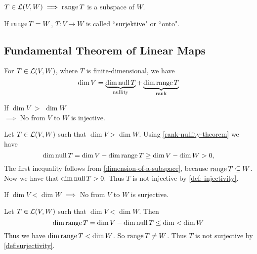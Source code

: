 \setcounter{thm}{17}
\begin{thm} [range]
  \label{thm: the range is a subspace}
  $T\in \mathcal{L}(V,W) \implies \operatorname{range} T$ is a subspace of $W$.
\end{thm}

\setcounter{thm}{18}
\begin{mydef} [surjectivity]
  \label{def: surjectivity}
  If $\operatorname{range} T=W$, $T:V\to W$ is called ``surjektive" or ``onto".
\end{mydef}

\subsection{Fundamental Theorem of Linear Maps}

  \setcounter{thm}{20}
  \begin{thm} 
    \label{rank-nullity-theorem}
    For $T \in {\mathcal{L}(V,W)}$, where $T$ is finite-dimensional, we have
    \begin{equation}
      \dim V =
      \underbrace{ \dim \operatorname{null} T }_{\text{nullity}}
      + \underbrace{\dim \operatorname{range} T}_{\text{rank}}
    \end{equation}
  \end{thm}

  \setcounter{thm}{21}
  \begin{thm} 
    \label{thm: linear-map-to-a-lower-dimensional-space-is-not-injective}
    If $\dim V$ $>$ $\dim W$ \\ 
    $\implies$ No \lm from $V$ to $W$ is injective.
  \end{thm}
  \begin{prf} Let $T\in \mathcal{L}(V,W)$ such that $\dim V > \dim W$. Using \ref{rank-nullity-theorem} we have
    \begin{equation}
      \dim \operatorname{null} T = \dim V - \dim \operatorname{range} T \geq \dim V - \dim W > 0,
    \end{equation}
    The first inequality follows from \ref{dimension-of-a-subspace}, because $\operatorname{range} T \subseteq W$. Now we have that $\dim \operatorname{null} T > 0.$ Thus $T$ is not injective by \autoref{def: injectivity}.
  \end{prf}

  \setcounter{thm}{23}
  \begin{thm} 
    If $\dim V < \dim W$ $\implies$ No \lm from $V$ to $W$ is surjective.
  \end{thm}
  \begin{prf}
    Let $T\in \mathcal{L} (V,W)$ such that $\dim V < \dim W$. Then
    \begin{equation}
      \dim \operatorname{range} T = \dim V - \dim \operatorname{null} T \leq \dim < \dim W
    \end{equation}
    Thus we have $\dim \operatorname{range} T < \dim W$. So $\operatorname{range} T \neq W$. Thus $T$ is not surjective by \autoref{def:surjectivity}.
  \end{prf}
   
